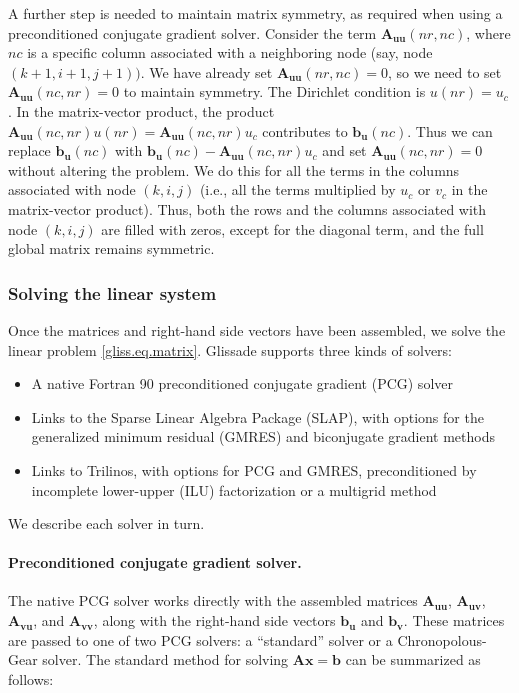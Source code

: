 {A further step is needed to maintain matrix symmetry, as required
when using a preconditioned conjugate gradient solver.  Consider the term $\mathbf{A_{uu}}(nr,nc)$,
where $nc$ is a specific column associated with a neighboring node (say, node $(k+1,i+1,j+1))$.
We have already set $\mathbf{A_{uu}}(nr,nc) = 0$, so we need to set $\mathbf{A_{uu}}(nc,nr) = 0$ to maintain
symmetry. The Dirichlet condition is $u(nr) = u_c$. 
In the matrix-vector product, the product $\mathbf{A_{uu}}(nc,nr) u(nr) = \mathbf{A_{uu}}(nc,nr) u_c$
contributes to $\mathbf{b_u}(nc)$.  Thus we can replace $\mathbf{b_u}(nc)$ with 
$\mathbf{b_u}(nc) -  \mathbf{A_{uu}}(nc,nr) u_c$
and set $\mathbf{A_{uu}}(nc,nr) = 0$ without altering the problem.
We do this for all the terms in the columns associated with node $(k,i,j)$ (i.e., all the
terms multiplied by $u_c$ or $v_c$ in the matrix-vector product).
Thus, both the rows and the columns associated with node $(k,i,j)$ are filled with zeros,
except for the diagonal term, and the full global matrix remains symmetric.

\subsubsection{Solving the linear system}

Once the matrices and right-hand side vectors have been assembled, we solve the linear problem
\eqref{gliss.eq.matrix}.  Glissade supports three kinds of solvers:

\begin{itemize}
\item A native Fortran 90 preconditioned conjugate gradient (PCG) solver
\item Links to the Sparse Linear Algebra Package (SLAP), with options for 
the generalized minimum residual (GMRES) and biconjugate gradient methods
\item Links to Trilinos, with options for PCG and GMRES, preconditioned by
incomplete lower-upper (ILU) factorization or a multigrid method
\end{itemize}

We describe each solver in turn.

\paragraph{Preconditioned conjugate gradient solver.}

The native PCG solver works directly with the assembled matrices
$\mathbf{A_{uu}}$, $\mathbf{A_{uv}}$, $\mathbf{A_{vu}}$, and $\mathbf{A_{vv}}$, along with the right-hand side vectors
$\mathbf{b_u}$ and $\mathbf{b_v}$.  These matrices are passed to one of two PCG solvers:
a ``standard'' solver or a Chronopolous-Gear solver.  The standard method 
for solving $\mathbf{Ax} = \mathbf{b}$ can be summarized as follows:

}
